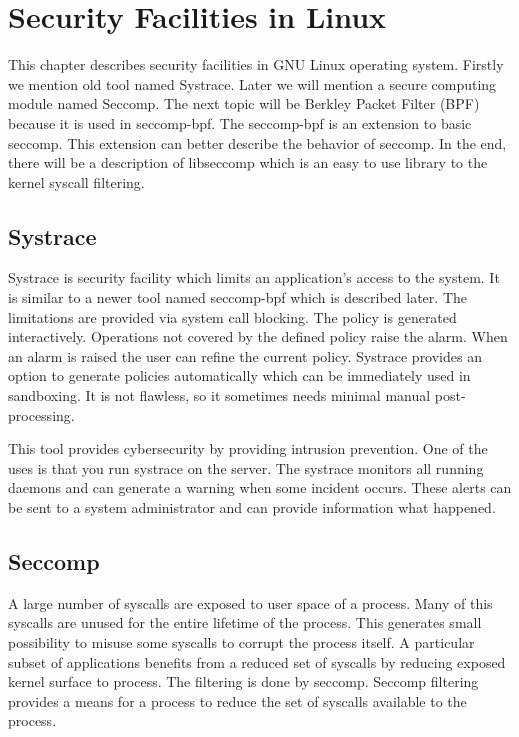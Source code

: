 \chapter{Security Facilities in Linux}
This chapter describes security facilities in GNU Linux operating system.
Firstly we mention old tool named Systrace\cite{systrace_web}.
Later we will mention a secure computing module named Seccomp\cite{seccomp_sandbox}.
The next topic will be Berkley Packet Filter (BPF) because it is used in seccomp-bpf.
The seccomp-bpf is an extension to basic seccomp.
This extension can better describe the behavior of seccomp.
In the end, there will be a description of libseccomp which is an easy to use library to the kernel syscall filtering.

\section{Systrace}
Systrace is security facility which limits an application's access to the system.
It is similar to a newer tool named seccomp-bpf which is described later.
The limitations are provided via system call blocking.
The policy is generated interactively.
Operations not covered by the defined policy raise the alarm.
When an alarm is raised the user can refine the current policy.
Systrace provides an option to generate policies automatically which can be immediately used in sandboxing.
It is not flawless, so it sometimes needs minimal manual post-processing.

This tool provides cybersecurity by providing intrusion prevention.
One of the uses is that you run systrace on the server.
The systrace monitors all running daemons and can generate a warning when some incident occurs.
These alerts can be sent to a system administrator and can provide information what happened.

\section{Seccomp}
A large number of syscalls are exposed to user space of a process. 
Many of this syscalls are unused for the entire lifetime of the process.
This generates small possibility to misuse some syscalls to corrupt the process itself.
A particular subset of applications benefits from a reduced set of syscalls by reducing exposed kernel surface to process.
The filtering is done by seccomp.
Seccomp filtering provides a means for a process to reduce the set of syscalls available to the process\cite{seccomp_kernel_doc}.

